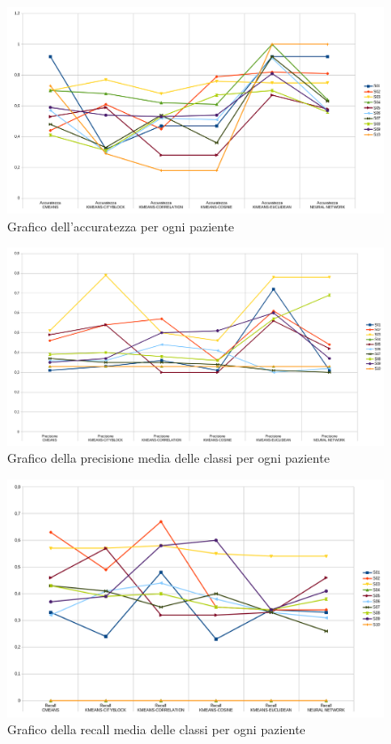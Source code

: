 \begin{figure}[]
	\centering
	\includegraphics[scale=0.35]{images/accuratezza.png}
	\caption{Grafico dell'accuratezza per ogni paziente}
	\label{Accuratezza}
\end{figure}
\begin{figure}[]
	\centering
	\includegraphics[scale=0.3]{images/precisione.png}
	\caption{Grafico della precisione media delle classi per ogni paziente}
	\label{Precisione}
\end{figure}
\begin{figure}[]
	\centering
	\includegraphics[scale=0.35]{images/recall.png}
	\caption{Grafico della recall media delle classi per ogni paziente}
	\label{Recall}
\end{figure}
